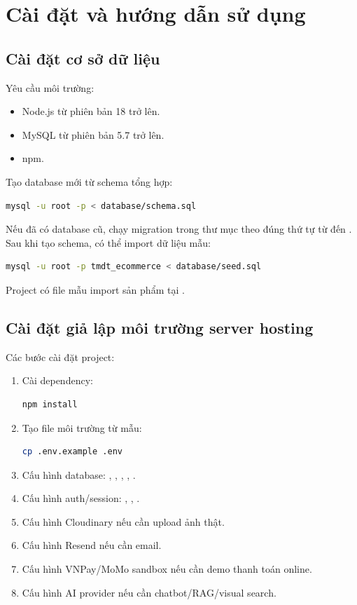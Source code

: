 \documentclass[12pt,a4paper]{report}
\begin{document}
\chapter{Cài đặt và hướng dẫn sử dụng}

\section{Cài đặt cơ sở dữ liệu}

Yêu cầu môi trường:

\begin{itemize}
    \item Node.js từ phiên bản 18 trở lên.
    \item MySQL từ phiên bản 5.7 trở lên.
    \item npm.
\end{itemize}

Tạo database mới từ schema tổng hợp:

\begin{lstlisting}[language=bash]
mysql -u root -p < database/schema.sql
\end{lstlisting}

Nếu đã có database cũ, chạy migration trong thư mục  theo đúng thứ tự từ  đến . Sau khi tạo schema, có thể import dữ liệu mẫu:

\begin{lstlisting}[language=bash]
mysql -u root -p tmdt_ecommerce < database/seed.sql
\end{lstlisting}

Project có file mẫu import sản phẩm tại .

\section{Cài đặt giả lập môi trường server hosting}

Các bước cài đặt project:

\begin{enumerate}
    \item Cài dependency:
\begin{lstlisting}[language=bash]
npm install
\end{lstlisting}
    \item Tạo file môi trường từ mẫu:
\begin{lstlisting}[language=bash]
cp .env.example .env
\end{lstlisting}
    \item Cấu hình database: , , , , .
    \item Cấu hình auth/session: , , .
    \item Cấu hình Cloudinary nếu cần upload ảnh thật.
    \item Cấu hình Resend nếu cần email.
    \item Cấu hình VNPay/MoMo sandbox nếu cần demo thanh toán online.
    \item Cấu hình AI provider nếu cần chatbot/RAG/visual search.
\end{enumerate}
\end{document}
